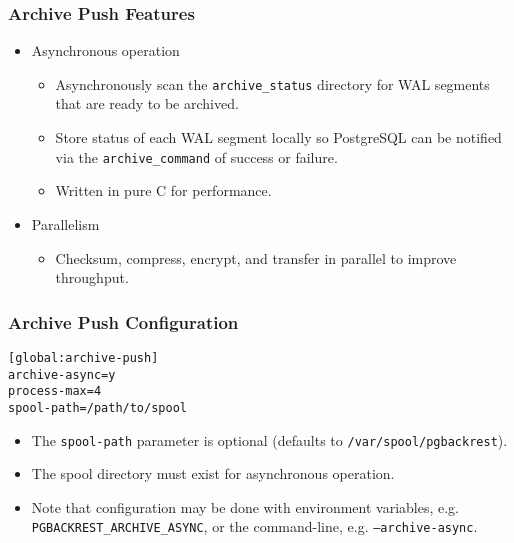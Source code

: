 \begin{frame}
    \frametitle{Archive Push Features}

    \begin{itemize}
        \item Asynchronous operation

        \begin{itemize}
            \item Asynchronously scan the \texttt{archive\_status} directory for WAL segments that are ready to be archived.\pause
            \item Store status of each WAL segment locally so PostgreSQL can be notified via the \texttt{archive\_command} of success or failure.\pause
            \item Written in pure C for performance.\pause
        \end{itemize}

        \item Parallelism

        \begin{itemize}
            \item Checksum, compress, encrypt, and transfer in parallel to improve throughput.
        \end{itemize}
    \end{itemize}
\end{frame}

\begin{frame}[fragile]
    \frametitle{Archive Push Configuration}

    \vspace{.75em}\begin{lstlisting}[title=pgbackrest.conf]
[global:archive-push]
archive-async=y
process-max=4
spool-path=/path/to/spool
    \end{lstlisting}\pause\vspace{1em}

    \begin{itemize}
        \item The \texttt{spool-path} parameter is optional (defaults to \texttt{/var/spool/pgbackrest}).\pause
        \item The spool directory must exist for asynchronous operation.\pause
        \item Note that configuration may be done with environment variables, e.g. \texttt{PGBACKREST\_ARCHIVE\_ASYNC}, or the command-line, e.g. \texttt{--archive-async}.
    \end{itemize}
\end{frame}

